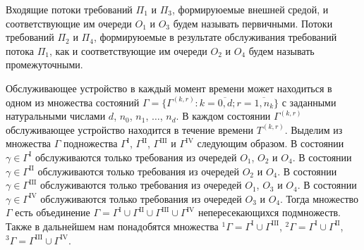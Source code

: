 Входящие потоки требований $\Pi_1$ и $\Pi_3$, формируюемые внешней средой, и соответствующие им очереди $O_1$ и $O_3$ будем называть первичными. Потоки требований $\Pi_2$ и $\Pi_4$, формируюемые в результате обслуживания требований потока $\Pi_1$, как и соответствующие им очереди $O_2$ и $O_4$ будем называть промежуточными.

Обслуживающее устройство в каждый момент времени может находиться в одном из множества состояний $\Gamma=\{\Gamma^{(k, r)} \colon k=\overline{0, d}; r=\overline{1, n_k}\}$ с заданными натуральными числами $d$,  $n_0$,  $n_1$,  $\ldots$,  $n_d$. В каждом состоянии $\Gamma^{(k, r)}$ обслуживающее устройство находится в течение времени $T^{(k, r)}$. Выделим из множества $\Gamma$ подножества $\Gamma^{\mathrm{I}}$,  $\Gamma^{\mathrm{II}}$, 
$\Gamma^{\mathrm{III}}$ и $\Gamma^{\mathrm{IV}}$ следующим образом. В состоянии $\gamma \in \Gamma^{\mathrm{I}}$ обслуживаются только требования из очередей $O_1$,  $O_2$ и $O_4$.
В состоянии $\gamma \in \Gamma^{\mathrm{II}}$ обслуживаются только требования из очередей $O_2$ и $O_4$.
В состоянии $\gamma \in \Gamma^{\mathrm{III}}$ обслуживаются только требования из очередей $O_1$,  $O_3$ и $O_4$.
В состоянии $\gamma \in \Gamma^{\mathrm{IV}}$ обслуживаются только требования из очередей $O_3$ и $O_4$.
Тогда множество $\Gamma$ есть объединение $\Gamma = \Gamma^{\mathrm{I}} \cup \Gamma^{\mathrm{II}} \cup \Gamma^{\mathrm{III}} \cup\Gamma^{\mathrm{IV}}$ непересекающихся подмножеств. Также в дальнейшем нам понадобятся множества ${}^1\Gamma=\Gamma^{\mathrm{I}} \cup \Gamma^{\mathrm{III}}$,  
${}^2\Gamma=\Gamma^{\mathrm{I}} \cup \Gamma^{\mathrm{II}}$, 
${}^3\Gamma=\Gamma^{\mathrm{III}} \cup \Gamma^{\mathrm{IV}}$. 

